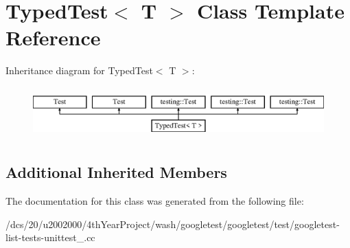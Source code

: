 \hypertarget{classTypedTest}{}\section{Typed\+Test$<$ T $>$ Class Template Reference}
\label{classTypedTest}
Inheritance diagram for Typed\+Test$<$ T $>$\+:\begin{figure}[H]
\begin{center}
\leavevmode
\includegraphics[height=2.000000cm]{classTypedTest}
\end{center}
\end{figure}
\subsection*{Additional Inherited Members}


The documentation for this class was generated from the following file\+:\begin{DoxyCompactItemize}
\item 
/dcs/20/u2002000/4th\+Year\+Project/wash/googletest/googletest/test/googletest-\/list-\/tests-\/unittest\+\_\+.\+cc\end{DoxyCompactItemize}
